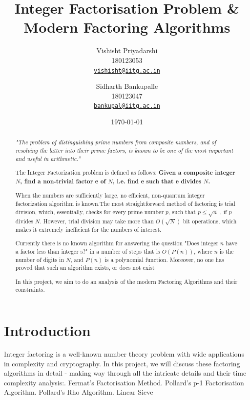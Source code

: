 \documentclass[11pt]{article}
\title{Integer Factorisation Problem \& Modern Factoring Algorithms}
\author{Vishisht Priyadarshi\\ 180123053 \\
    \href{mailto:vishisht@iitg.ac.in}{\texttt{vishisht@iitg.ac.in}} %
\and Sidharth Bankupalle\\ 180123047 \\
    \href{mailto:bankupal@iitg.ac.in}{\texttt{bankupal@iitg.ac.in}} %
    }
\date{\today}
\begin{document}
{
\maketitle
\begin{abstract}
    \emph{"The problem of distinguishing prime numbers from composite numbers, and of resolving the latter into their prime factors, is known to be one of the most important and useful in arithmetic.”}
    
    The Integer Factorization problem is defined as follows:
    \textbf{Given a composite integer $N$, find a non-trivial factor e of $N$, i.e. find e such that e divides $N$.}
    
    When the numbers are sufficiently large, no efficient, non-quantum integer factorization algorithm is known.The most straightforward method of factoring is trial division, which, essentially, checks for every prime number $p$, such that $p \leq \sqrt{n}$ , if $p$ divides $N$. However, trial division may take more than $O\left( \sqrt {N}\right) $ bit operations, which makes it extremely inefficient for the numbers of interest.
    
    Currently there is no known algorithm for answering the question "Does integer $n$ have a factor less than integer s?" in a number of steps that is $O\left( P\left( n\right) \right)$, where $n$ is the number of digits in $N$, and $P\left(n\right)$ is a polynomial function. Moreover, no one has proved that such an algorithm exists, or does not exist
    
    In this project, we aim to do an analysis of the modern Factoring Algorithms and their constraints.

\end{abstract}
}



\section*{Introduction}
\begin{flushleft}
    Integer factoring is a well-known number theory problem with wide applications in complexity and cryptography.
    In this project, we will discuss these factoring algorithms in detail - making way through all the intricate details and their time complexity analysis:. Fermat's Factorisation Method. Pollard's p-1 Factorisation Algorithm. Pollard's Rho Algorithm. Linear Sieve\break
\end{flushleft}
\end{document}
